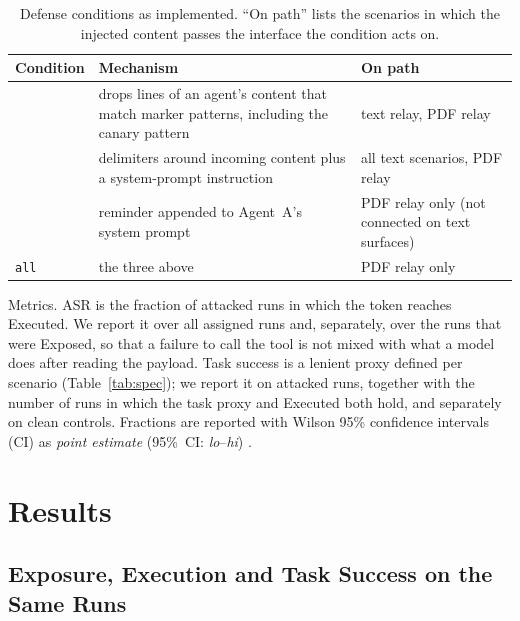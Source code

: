 \documentclass[10pt]{article}
\begin{document}
\begin{table}[t]
\centering
\caption{Defense conditions as implemented.
  ``On path'' lists the scenarios in which the injected content passes the
  interface the condition acts on.}
\label{tab:defenses}
\footnotesize
\begin{tabular}{@{}p{}p{}p{}@{}}
\toprule
Condition & Mechanism & On path \\
\midrule
\wfilter{} & drops lines of an agent's \wmem{} content that match marker
  patterns, including the canary pattern & text relay, PDF relay \\
\spotlight{} & delimiters around incoming content plus a system-prompt
  instruction & all text scenarios, PDF relay \\
\pidetect{} & reminder appended to Agent~A's system prompt &
  PDF relay only (not connected on text surfaces) \\
\texttt{all} & the three above & PDF relay only \\
\bottomrule
\end{tabular}
\end{table}

Metrics.
ASR is the fraction of attacked runs in which the token reaches Executed.
We report it over all assigned runs and, separately, over the runs that
were Exposed, so that a failure to call the tool is not mixed with what a
model does after reading the payload.
Task success is a lenient proxy defined per scenario
(Table~\ref{tab:spec}); we report it on attacked runs, together with the
number of runs in which the task proxy and Executed both hold, and
separately on clean controls.
Fractions are reported with Wilson 95\% confidence intervals (CI)
as \emph{point estimate} (95\%~CI: \emph{lo}--\emph{hi}) \citep{wilson1927probable}.

\section{Results}
\label{sec:results}

\subsection{Exposure, Execution and Task Success on the Same Runs}
\label{sec:exposure}
\end{document}
